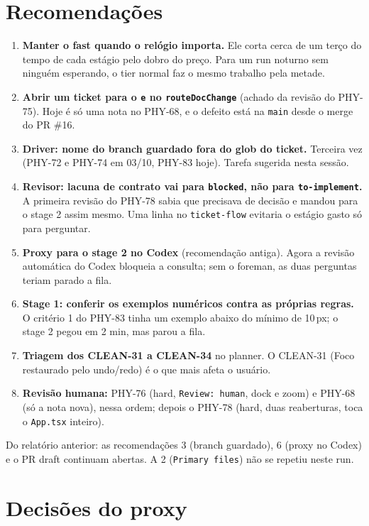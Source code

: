 \documentclass[11pt,a4paper]{article}
\begin{document}
\section{Recomendações}
\begin{enumerate}
  \item \textbf{Manter o fast quando o relógio importa.} Ele corta cerca de
        um terço do tempo de cada estágio pelo dobro do preço. Para um run
        noturno sem ninguém esperando, o tier normal faz o mesmo trabalho pela
        metade.
  \item \textbf{Abrir um ticket para o \texttt{e} no \texttt{routeDocChange}}
        (achado da revisão do PHY-75). Hoje é só uma nota no PHY-68, e o
        defeito está na \texttt{main} desde o merge do PR \#16.
  \item \textbf{Driver: nome do branch guardado fora do glob do ticket.}
        Terceira vez (PHY-72 e PHY-74 em 03/10, PHY-83 hoje). Tarefa sugerida
        nesta sessão.
  \item \textbf{Revisor: lacuna de contrato vai para \texttt{blocked}, não para
        \texttt{to-implement}.} A primeira revisão do PHY-78 sabia que
        precisava de decisão e mandou para o stage 2 assim mesmo. Uma linha no
        \texttt{ticket-flow} evitaria o estágio gasto só para perguntar.
  \item \textbf{Proxy para o stage 2 no Codex} (recomendação antiga). Agora a
        revisão automática do Codex bloqueia a consulta; sem o foreman, as duas
        perguntas teriam parado a fila.
  \item \textbf{Stage 1: conferir os exemplos numéricos contra as próprias
        regras.} O critério 1 do PHY-83 tinha um exemplo abaixo do mínimo de
        10\,px; o stage 2 pegou em 2 min, mas parou a fila.
  \item \textbf{Triagem dos CLEAN-31 a CLEAN-34} no planner. O CLEAN-31 (Foco
        restaurado pelo undo/redo) é o que mais afeta o usuário.
  \item \textbf{Revisão humana:} PHY-76 (hard, \texttt{Review: human}, dock e
        zoom) e PHY-68 (só a nota nova), nessa ordem; depois o PHY-78 (hard,
        duas reaberturas, toca o \texttt{App.tsx} inteiro).
\end{enumerate}

Do relatório anterior: as recomendações 3 (branch guardado), 6 (proxy no
Codex) e o PR draft continuam abertas. A 2 (\texttt{Primary files}) não se
repetiu neste run.

\section{Decisões do proxy}
\end{document}
